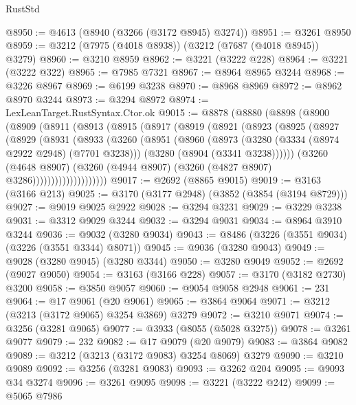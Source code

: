 \begin{lexlean}{RustStd}
\begin{coremodule}
{\begin{coremodule}
{{{{{{{{{{{{{{{{{{{{{{{{{{@8950 := @4613 (@8940 (@3266 (@3172 @8945) @3274))
@8951 := @3261 @8950
@8959 := @3212 (@7975 (@4018 @8938)) (@3212 (@7687 (@4018 @8945)) @3279)
@8960 := @3210 @8959
@8962 := @3221 (@3222 @228)
@8964 := @3221 (@3222 @322)
@8965 := @7985 @7321
@8967 := @8964 @8965 @3244
@8968 := @3226 @8967
@8969 := @6199 @3238
@8970 := @8968 @8969
@8972 := @8962 @8970 @3244
@8973 := @3294 @8972
@8974 := LexLeanTarget.RustSyntax.Ctor.ok
@9015 := @8878
    (@8880
      (@8898
        (@8900
          (@8909
            (@8911
              (@8913
                (@8915
                  (@8917
                    (@8919
                      (@8921
                        (@8923
                          (@8925
                            (@8927
                              (@8929
                                (@8931
                                  (@8933
                                    (@3260
                                      (@8951
                                        (@8960
                                          (@8973
                                            (@3280 (@3334 (@8974 @2922 @2948) (@7701 @3238)))
                                            (@3280 (@8904 (@3341 @3238))))))
                                      (@3260
                                        (@4648 @8907)
                                        (@3260
                                          (@4944 @8907)
                                          (@3260 (@4827 @8907) @3286))))))))))))))))))))
@9017 := @2692 (@8865 @9015)
@9019 := @3163 (@3166 @213)
@9025 := @3170 (@3177 @2948) (@3852 (@3854 (@3194 @8729)))
@9027 := @9019 @9025 @2922
@9028 := @3294 @3231
@9029 := @3229 @3238
@9031 := @3312 @9029 @3244
@9032 := @3294 @9031
@9034 := @8964 @3910 @3244
@9036 := @9032 (@3280 @9034)
@9043 := @8486 (@3226 (@3551 @9034) (@3226 (@3551 @3344) @8071))
@9045 := @9036 (@3280 @9043)
@9049 := @9028 (@3280 @9045) (@3280 @3344)
@9050 := @3280 @9049
@9052 := @2692 (@9027 @9050)
@9054 := @3163 (@3166 @228)
@9057 := @3170 (@3182 @2730) @3200
@9058 := @3850 @9057
@9060 := @9054 @9058 @2948
@9061 := 231
@9064 := @17 @9061 (@20 @9061)
@9065 := @3864 @9064
@9071 := @3212 (@3213 (@3172 @9065) @3254 @3869) @3279
@9072 := @3210 @9071
@9074 := @3256 (@3281 @9065)
@9077 := @3933 (@8055 (@5028 @3275))
@9078 := @3261 @9077
@9079 := 232
@9082 := @17 @9079 (@20 @9079)
@9083 := @3864 @9082
@9089 := @3212 (@3213 (@3172 @9083) @3254 @8069) @3279
@9090 := @3210 @9089
@9092 := @3256 (@3281 @9083)
@9093 := @3262 @204
@9095 := @9093 @34 @3274
@9096 := @3261 @9095
@9098 := @3221 (@3222 @242)
@9099 := @5065 @7986
}}}}}}}}}}}}}}}}}}}}}}}}}}
\end{coremodule}}
\end{coremodule}
\end{lexlean}
